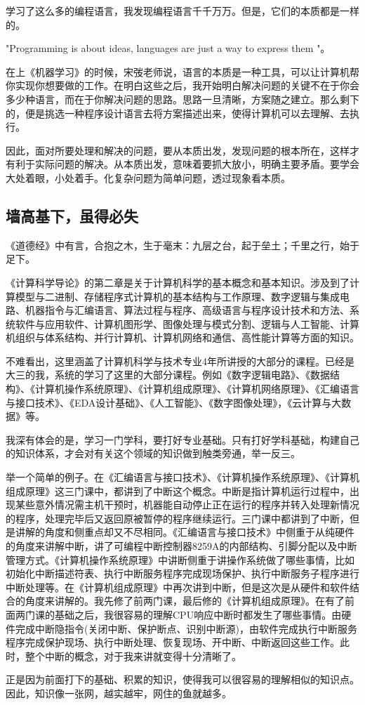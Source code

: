 \documentclass{article}
\begin{document}
学习了这么多的编程语言，我发现编程语言千千万万。但是，它们的本质都是一样的。\par
"Programming is about ideas, languages are just a way to express them "。\citep{r3}\par
在上《机器学习》的时候，宋弢老师说，语言的本质是一种工具，可以让计算机帮你实现你想要做的工作。在明白这些之后，我开始明白解决问题的关键不在于你会多少种语言，而在于你解决问题的思路。思路一旦清晰，方案随之建立。那么剩下的，便是挑选一种程序设计语言去将方案描述出来，使得计算机可以去理解、去执行。\par
因此，面对所要处理和解决的问题，要从本质出发，发现问题的根本所在，这样才有利于实际问题的解决。从本质出发，意味着要抓大放小，明确主要矛盾。要学会大处着眼，小处着手。化复杂问题为简单问题，透过现象看本质。
\par

\subsection{墙高基下，虽得必失}
《道德经》中有言，合抱之木，生于毫末：九层之台，起于垒土；千里之行，始于足下。\par
《计算科学导论》的第二章是关于计算机科学的基本概念和基本知识。涉及到了计算模型与二进制、存储程序式计算机的基本结构与工作原理、数字逻辑与集成电路、机器指令与汇编语言、算法过程与程序、高级语言与程序设计技术和方法、系统软件与应用软件、计算机图形学、图像处理与模式分割、逻辑与人工智能、计算机组织与体系结构、并行计算机、计算机网络和通信、高性能计算等方面的知识。\par
不难看出，这里涵盖了计算机科学与技术专业4年所讲授的大部分的课程。已经是大三的我，系统的学习了这里的大部分课程。例如《数字逻辑电路》、《数据结构》、《计算机操作系统原理》、《计算机组成原理》、《计算机网络原理》、《汇编语言与接口技术》、《EDA设计基础》、《人工智能》、《数字图像处理》，《云计算与大数据》等。\par
我深有体会的是，学习一门学科，要打好专业基础。只有打好学科基础，构建自己的知识体系，才会对有关这个领域的知识做到触类旁通，举一反三。\par
举一个简单的例子。在《汇编语言与接口技术\citep{r4}》、《计算机操作系统原理\citep{r5}》、《计算机组成原理\citep{r6}》这三门课中，都讲到了中断这个概念。中断是指计算机运行过程中，出现某些意外情况需主机干预时，机器能自动停止正在运行的程序并转入处理新情况的程序，处理完毕后又返回原被暂停的程序继续运行。三门课中都讲到了中断，但是讲解的角度和侧重点却又不尽相同。《汇编语言与接口技术》中侧重于从纯硬件的角度来讲解中断，讲了可编程中断控制器8259A的内部结构、引脚分配以及中断管理方式。《计算机操作系统原理》中讲断侧重于讲操作系统做了哪些事情，比如初始化中断描述符表、执行中断服务程序完成现场保护、执行中断服务子程序进行中断处理等。在《计算机组成原理》中再次讲到中断，但是这次是从硬件和软件结合的角度来讲解的。我先修了前两门课，最后修的《计算机组成原理》。在有了前面两门课的基础之后，我很容易的理解CPU响应中断时都发生了哪些事情。由硬件完成中断隐指令(关闭中断、保护断点、识别中断源)，由软件完成执行中断服务程序完成保护现场、执行中断处理、恢复现场、开中断、中断返回这些工作。此时，整个中断的概念，对于我来讲就变得十分清晰了。\par
正是因为前面打下的基础、积累的知识，使得我可以很容易的理解相似的知识点。因此，知识像一张网，越实越牢，网住的鱼就越多。\par
\end{document}
